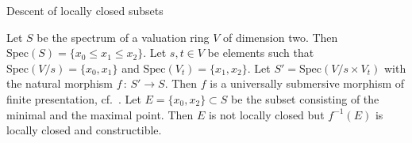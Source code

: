 \documentclass[a4paper,twoside,11pt]{amsart}[2009/07/02] %
\newcommand{\map}[3]{#1\,:\, #2\rightarrow #3}
\newcommand{\Spec}{\mathrm{Spec}}
\begin{document}
\begin{section}{Descent of locally closed subsets}
\begin{example}\label{E:submersive-non-subtrusive}
Let $S$ be the spectrum of a valuation ring $V$ of dimension two. Then
$\Spec(S)=\{x_0\leq x_1\leq x_2\}$. Let $s,t\in V$ be elements such that
$\Spec(V/s)=\{x_0,x_1\}$ and $\Spec(V_t)=\{x_1,x_2\}$. Let $S'=\Spec(V/s\times
V_t)$ with the natural morphism $\map{f}{S'}{S}$. Then $f$ is a universally
submersive morphism of finite presentation, cf.\
\cite[Cor.~33]{picavet_submersion}. Let $E=\{x_0,x_2\}\subset S$ be the subset
consisting of the minimal and the maximal point. Then $E$ is not locally closed
but $f^{-1}(E)$ is locally closed and constructible.
\end{example}

\end{section}

\end{document}
